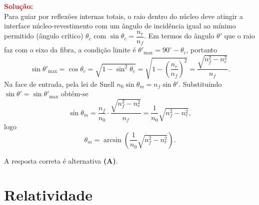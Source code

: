 \documentclass[a4paper,12pt]{article}
\begin{document}
\begin{flushleft}
\vspace{0.5cm}

\textcolor{red}{\textbf{Solução:}}\\

Para guiar por reflexões internas totais, o raio dentro do núcleo deve atingir a interface núcleo-revestimento com um ângulo de incidência 
igual ao mínimo permitido (ângulo crítico) \(\theta_c\) com \(\sin\theta_c=\dfrac{n_r}{n_f}\). Em termos do ângulo \(\theta'\) que o raio faz 
com o eixo da fibra, a condição limite é \(\theta'_{\max}=90^\circ-\theta_c\), portanto
\[
\sin\theta'_{\max}=\cos\theta_c=\sqrt{1-\sin^2\theta_c}=\sqrt{1-\left(\frac{n_r}{n_f}\right)^2}=\frac{\sqrt{n_f^2-n_r^2}}{n_f}.
\]
Na face de entrada, pela lei de Snell \(n_0\sin\theta_m=n_f\sin\theta'\). Substituindo \(\sin\theta'=\sin\theta'_{\max}\) obtém-se
\[
\sin\theta_m=\frac{n_f}{n_0}\cdot\frac{\sqrt{n_f^2-n_r^2}}{n_f}=\frac{1}{n_0}\sqrt{n_f^2-n_r^2},
\]
logo
\[
\theta_m=\arcsin\!\left(\frac{1}{n_0}\sqrt{n_f^2-n_r^2}\right).
\]

A resposta correta é alternativa \colorbox{green!50}{\textbf{(A)}}.

\end{flushleft}

\section{Relatividade}
\end{document}

